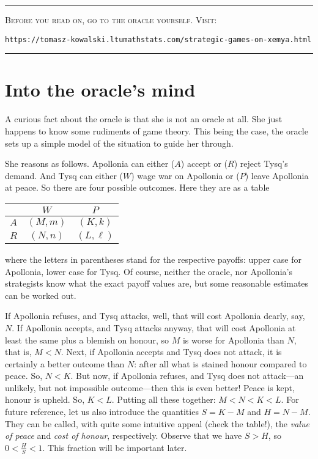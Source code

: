 \documentclass{amsart}
\begin{document}
\vskip1cm
\hrule
\bigskip\noindent
\textsc{Before you read on, go to the oracle yourself. Visit:}

\medskip
\noindent
\texttt{https://tomasz-kowalski.ltumathstats.com/strategic-games-on-xemya.html} 

\bigskip
\hrule




\newpage

\section{Into the oracle's mind}


A curious fact about the oracle is that she is not an oracle at all. She just
happens to know some rudiments of game theory. This being the case, the
oracle sets up a simple model of the situation to guide her through.   

\bigskip

She reasons as follows. Apollonia can either ($A$) accept or ($R$) reject Tysq's
demand. And Tysq can either ($W$) wage war on Apollonia or 
($P$) leave Apollonia at peace. So there are four possible outcomes. 
Here they are as a table
\begin{center}
\begin{tabular}{c|cc}
  & $W$      & $P$ \\
\hline
$A$ & $(M,m)$  & $(K,k)$  \\
$R$ & $(N,n)$  & $(L,\ell)$  
\end{tabular}
\end{center}
where the letters in parentheses stand for the respective payoffs:
upper case for Apollonia, lower case for Tysq. 
Of course, neither the oracle, nor Apollonia's strategists know what the exact payoff
values are, but some reasonable estimates can be worked out. 

If Apollonia refuses, and Tysq attacks, well, 
that will cost Apollonia dearly, say, $N$. If Apollonia accepts, and Tysq attacks
anyway, that will cost Apollonia at least the same plus a blemish
on honour, so $M$ is worse
for Apollonia than $N$, that is, $M < N$. 
Next, if Apollonia accepts and Tysq does not attack, it is certainly a better
outcome than $N$: after all what is stained honour compared to peace. So, $N < K$. 
But now, if Apollonia refuses, and Tysq does not attack---an unlikely, but
not impossible outcome---then this is even better! Peace is kept, honour is
upheld. So, $K < L$. Putting all these together: $M<N<K<L$. For future
reference, let us also introduce the quantities $S = K-M$ and 
$H = N-M$. They can be called, with quite some intuitive appeal 
(check the table!), the \emph{value of peace} and \emph{cost of honour}, respectively. 
Observe that we have $S>H$, so $0<\frac{H}{S} <1$. 
This fraction will be important later. 
\end{document}
